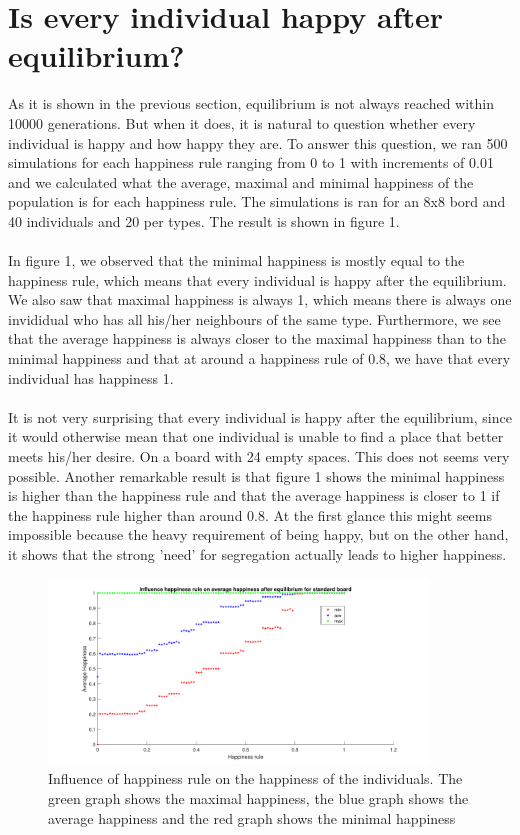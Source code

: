 
\section{Is every individual happy after equilibrium?}
As it is shown in the previous section, equilibrium is not always reached within 10000 generations. But when it does, it is natural to question whether every individual is happy and how happy they are. To answer this question, we ran 500 simulations for each happiness rule ranging from 0 to 1 with increments of 0.01 and we calculated what the average, maximal and minimal happiness of the population is for each happiness rule. The simulations is ran for an 8x8 bord and 40 individuals and 20 per types. The result is shown in figure 1.\\
\\
In figure 1, we observed that the minimal happiness is mostly equal to the happiness rule, which means that every individual is happy after the equilibrium. We also saw that maximal happiness is always 1, which means there is always one invididual who has all his/her neighbours of the same type. Furthermore, we see that the average happiness is always closer to the maximal happiness than to the minimal happiness and that at around a happiness rule of 0.8, we have that every individual has happiness 1.\\
\\
It is not very surprising that every individual is happy after the equilibrium, since it would otherwise mean that one individual is unable to find a place that better meets his/her desire. On a board with 24 empty spaces. This does not seems very possible. Another remarkable result is that figure 1 shows the minimal happiness is higher than the happiness rule and that the average happiness is closer to 1 if the happiness rule higher than around 0.8. At the first glance this might seems impossible because the heavy requirement of being happy, but on the other hand, it shows that the strong 'need' for segregation actually leads to higher happiness.
\begin{figure}[h!]
    \centering
    \includegraphics[width=0.9\textwidth]{happinessregel-gemhappinesseind-2}
    \caption{Influence of happiness rule on the happiness of the individuals. The green graph shows the maximal happiness, the blue graph shows the average happiness and the red graph shows the minimal happiness}
\end{figure}
